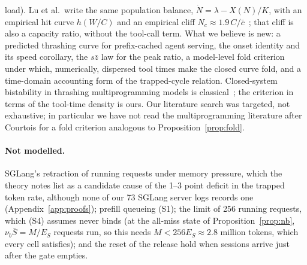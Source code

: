 load). Lu et al.\ write the same population balance, $\dot N=\lambda-X(N)/K$, with an empirical hit curve $h(W/C)$ and an empirical cliff $N_c\approx1.9\,C/\bar c$~\citep{lu2026cachetrap}; that cliff is also a capacity ratio, without the tool-call term. What we believe is new: a predicted thrashing curve for prefix-cached agent serving, the onset identity and its speed corollary, the $s\bar z$ law for the peak ratio, a model-level fold criterion under which, numerically, dispersed tool times make the closed curve fold, and a time-domain accounting form of the trapped-cycle relation. Closed-system bistability in thrashing multiprogramming models is classical~\citep{courtois1975decomposability,nelson1987stochastic}; the criterion in terms of the tool-time density is ours. Our literature search was targeted, not exhaustive; in particular we have not read the multiprogramming literature after Courtois for a fold criterion analogous to Proposition~\ref{prop:fold}.

\paragraph{Not modelled.} SGLang's retraction of running requests under memory pressure, which the theory notes list as a candidate cause of the 1--3 point deficit in the trapped token rate, although none of our 73 SGLang server logs records one (Appendix~\ref{app:proofs}); prefill queueing (S1); the limit of 256 running requests, which (S4) assumes never binds (at the all-miss state of Proposition~\ref{prop:nb}, $\nu_b\bar S=M/E_S$ requests run, so this needs $M<256E_S\approx2.8$ million tokens, which every cell satisfies); and the reset of the release hold when sessions arrive just after the gate empties.
